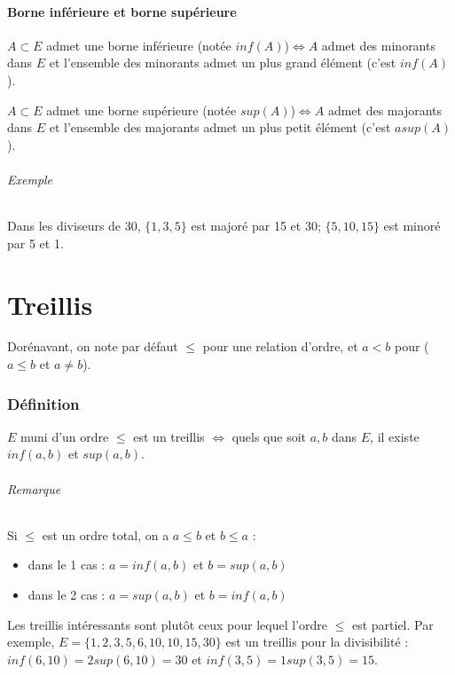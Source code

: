 \documentclass[11pt]{article}
\begin{document}
        \subsection{Borne inférieure et borne supérieure}
            $A\subset E$ admet une borne inférieure (notée $inf(A)$)$\Leftrightarrow A$ admet des minorants dans $E$ et l'ensemble des minorants admet un plus grand élément (c'est $inf(A)$).

            $A\subset E$ admet une borne supérieure (notée $sup(A)$)$\Leftrightarrow A$ admet des majorants dans $E$ et l'ensemble des majorants admet un plus petit élément (c'est $asup(A)$).

            \paragraph{Exemple} Dans les diviseurs de 30, $\{1,3,5\}$ est majoré par 15 et 30; $\{5,10,15\}$ est minoré par 5 et 1.

\newpage
\part{Treillis}
    Dorénavant, on note par défaut $\leq$ pour une relation d'ordre, et $a<b$ pour ($a\leq b$ et $a\neq b$).

    \section{Définition}
        $E$ muni d'un ordre $\leq$ est un treillis $\Leftrightarrow$ quels que soit $a,b$ dans $E$, il existe $inf(a,b)$ et $sup(a,b)$.

        \paragraph{Remarque} Si $\leq$ est un ordre total, on a $a\leq b$ et $b\leq a$ :
            \begin{itemize}
                \item dans le 1 cas : $a=inf(a,b)$ et $b=sup(a,b)$
                \item dans le 2 cas : $a=sup(a,b)$ et $b=inf(a,b)$
            \end{itemize}

        Les treillis intéressants sont plutôt ceux pour lequel l'ordre $\leq$ est partiel. Par exemple, $E=\{1,2,3,5,6,10,10,15,30\}$ est un treillis pour la divisibilité : $inf(6,10)=2sup(6,10)=30$ et $inf(3,5)=1sup(3,5)=15$.
\end{document}

